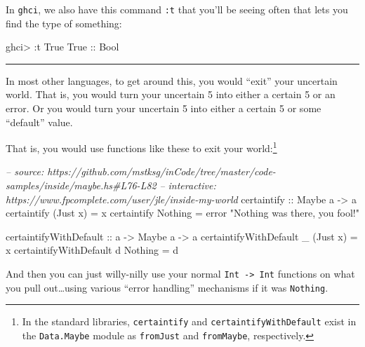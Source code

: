 \documentclass[]{article}
\newenvironment{Shaded}{}{}
\newcommand{\DataTypeTok}[1]{\textcolor[rgb]{0.56,0.13,0.00}{#1}}
\newcommand{\StringTok}[1]{\textcolor[rgb]{0.25,0.44,0.63}{#1}}
\newcommand{\CommentTok}[1]{\textcolor[rgb]{0.38,0.63,0.69}{\textit{#1}}}
\newcommand{\OtherTok}[1]{\textcolor[rgb]{0.00,0.44,0.13}{#1}}
\newcommand{\FunctionTok}[1]{\textcolor[rgb]{0.02,0.16,0.49}{#1}}
\newcommand{\NormalTok}[1]{#1}
\begin{document}
In \texttt{ghci}, we also have this command \texttt{:t} that you'll be seeing
often that lets you find the type of something:

\begin{Shaded}
\begin{Highlighting}[]
\NormalTok{ghci}\FunctionTok{>} \FunctionTok{:}\NormalTok{t }\DataTypeTok{True}
\DataTypeTok{True}\OtherTok{ ::} \DataTypeTok{Bool}
\end{Highlighting}
\end{Shaded}

\begin{center}\rule{0.5\linewidth}{\linethickness}\end{center}

In most other languages, to get around this, you would ``exit'' your uncertain
world. That is, you would turn your uncertain 5 into either a certain 5 or an
error. Or you would turn your uncertain 5 into either a certain 5 or some
``default'' value.

That is, you would use functions like these to exit your world:\footnote{In the
  standard libraries, \texttt{certaintify} and \texttt{certaintifyWithDefault}
  exist in the \texttt{Data.Maybe} module as \texttt{fromJust} and
  \texttt{fromMaybe}, respectively.}

\begin{Shaded}
\begin{Highlighting}[]
\CommentTok{-- source: https://github.com/mstksg/inCode/tree/master/code-samples/inside/maybe.hs#L76-L82}
\CommentTok{-- interactive: https://www.fpcomplete.com/user/jle/inside-my-world}
\OtherTok{certaintify ::} \DataTypeTok{Maybe}\NormalTok{ a }\OtherTok{->}\NormalTok{ a}
\NormalTok{certaintify (}\DataTypeTok{Just}\NormalTok{ x) }\FunctionTok{=}\NormalTok{ x}
\NormalTok{certaintify }\DataTypeTok{Nothing}  \FunctionTok{=}\NormalTok{ error }\StringTok{"Nothing was there, you fool!"}

\OtherTok{certaintifyWithDefault ::}\NormalTok{ a }\OtherTok{->} \DataTypeTok{Maybe}\NormalTok{ a }\OtherTok{->}\NormalTok{ a}
\NormalTok{certaintifyWithDefault _ (}\DataTypeTok{Just}\NormalTok{ x) }\FunctionTok{=}\NormalTok{ x}
\NormalTok{certaintifyWithDefault d }\DataTypeTok{Nothing}  \FunctionTok{=}\NormalTok{ d}
\end{Highlighting}
\end{Shaded}

And then you can just willy-nilly use your normal
\texttt{Int\ -\textgreater{}\ Int} functions on what you pull out\ldots{}using
various ``error handling'' mechanisms if it was \texttt{Nothing}.
\end{document}
